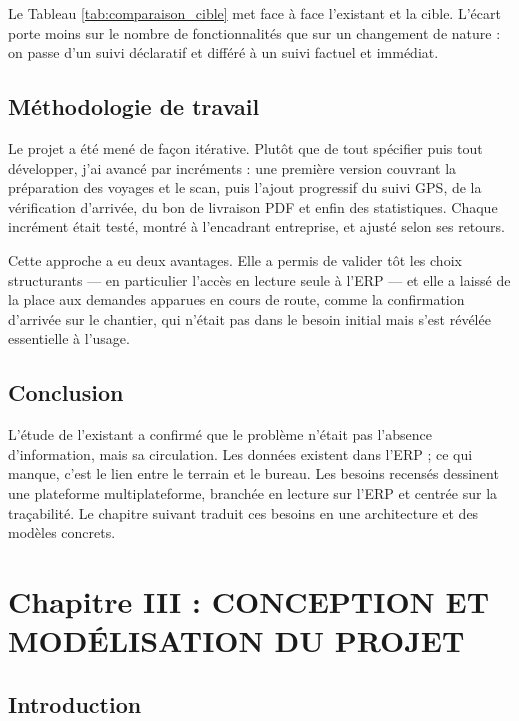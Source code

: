 \documentclass[12pt,a4paper]{report}
\begin{document}
Le Tableau \ref{tab:comparaison_cible} met face à face l'existant et la cible. L'écart porte moins sur le nombre de fonctionnalités que sur un changement de nature : on passe d'un suivi déclaratif et différé à un suivi factuel et immédiat.

\section{Méthodologie de travail}

Le projet a été mené de façon itérative. Plutôt que de tout spécifier puis tout développer, j'ai avancé par incréments : une première version couvrant la préparation des voyages et le scan, puis l'ajout progressif du suivi GPS, de la vérification d'arrivée, du bon de livraison PDF et enfin des statistiques. Chaque incrément était testé, montré à l'encadrant entreprise, et ajusté selon ses retours.

Cette approche a eu deux avantages. Elle a permis de valider tôt les choix structurants — en particulier l'accès en lecture seule à l'ERP — et elle a laissé de la place aux demandes apparues en cours de route, comme la confirmation d'arrivée sur le chantier, qui n'était pas dans le besoin initial mais s'est révélée essentielle à l'usage.

\section{Conclusion}

L'étude de l'existant a confirmé que le problème n'était pas l'absence d'information, mais sa circulation. Les données existent dans l'ERP ; ce qui manque, c'est le lien entre le terrain et le bureau. Les besoins recensés dessinent une plateforme multiplateforme, branchée en lecture sur l'ERP et centrée sur la traçabilité. Le chapitre suivant traduit ces besoins en une architecture et des modèles concrets.

\newpage

\chapter{Chapitre III : CONCEPTION ET MODÉLISATION DU PROJET}

\section{Introduction}
\end{document}
